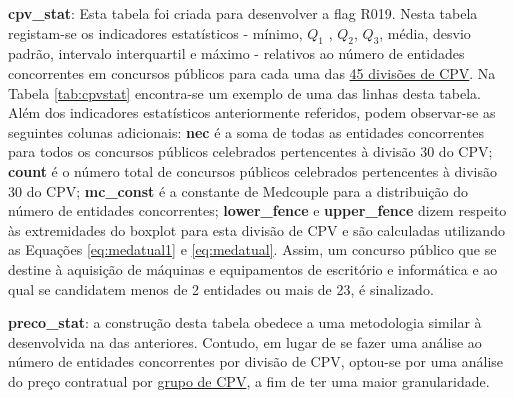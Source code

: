 \begin{my_itemize}
	
	\item \textbf{cpv\_stat}: Esta tabela foi criada para desenvolver a flag R019. Nesta tabela registam-se os indicadores estatísticos - mínimo, $Q_1$ , $Q_2$, $Q_3$, média, desvio padrão, intervalo interquartil e máximo - relativos ao número de entidades concorrentes em concursos públicos para cada uma das \hyperref[sec:cepeves]{45 divisões de CPV}. Na Tabela \ref{tab:cpvstat} encontra-se um exemplo de uma das linhas desta tabela. Além dos indicadores estatísticos anteriormente referidos, podem observar-se as seguintes colunas adicionais: \textbf{nec} é a soma de todas as entidades concorrentes para todos os concursos públicos celebrados pertencentes à divisão 30 do CPV; \textbf{count} é o número total de concursos públicos celebrados pertencentes à divisão 30 do CPV; \textbf{mc\_const} é a constante de Medcouple para a distribuição do número de entidades concorrentes; \textbf{lower\_fence} e \textbf{upper\_fence} dizem respeito às extremidades do boxplot para esta divisão de CPV e são calculadas utilizando as Equações \ref{eq:medatual1} e \ref{eq:medatual}. Assim, um concurso público que se destine à aquisição de máquinas e equipamentos de escritório e informática e ao qual se candidatem menos de 2 entidades ou mais de 23, é sinalizado.
	
	
	\item \textbf{preco\_stat}: a construção desta tabela obedece a uma metodologia similar à desenvolvida na das  anteriores. Contudo, em lugar de se fazer uma análise ao número de entidades concorrentes por divisão de CPV, optou-se por  uma análise do preço contratual por \hyperref[sec:cepeves]{grupo de CPV}, a fim de ter uma maior granularidade. 
	
	
\end{my_itemize}




\begin{table}[H]
	\centering
	\renewcommand{\arraystretch}{1.1}
	\caption{Exemplo de uma linha da tabela \textit{cpv\_stat} para concursos públicos referentes a aquisição de máquinas e equipamentos de escritório e informática, exceto móveis e pacotes de software.}
	\label{tab:cpvstat}	
\end{table}




